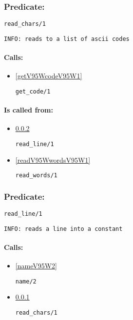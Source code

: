 \subsubsection{Predicate:} \label{readV95WcharsV95W1}

\begin{verbatim}
read_chars/1
\end{verbatim}

{\small \begin{verbatim}
INFO: reads to a list of ascii codes

\end{verbatim}}
\paragraph{Calls:} 
\begin{itemize}
\item \ref{getV95WcodeV95W1} 
\begin{verbatim}
get_code/1
\end{verbatim}

\end{itemize}
\paragraph{Is called from:} 
\begin{itemize}
\item \ref{readV95WlineV95W1} 
\begin{verbatim}
read_line/1
\end{verbatim}

\item \ref{readV95WwordsV95W1} 
\begin{verbatim}
read_words/1
\end{verbatim}

\end{itemize}

\subsubsection{Predicate:} \label{readV95WlineV95W1}

\begin{verbatim}
read_line/1
\end{verbatim}

{\small \begin{verbatim}
INFO: reads a line into a constant

\end{verbatim}}
\paragraph{Calls:} 
\begin{itemize}
\item \ref{nameV95W2} 
\begin{verbatim}
name/2
\end{verbatim}

\item \ref{readV95WcharsV95W1} 
\begin{verbatim}
read_chars/1
\end{verbatim}

\end{itemize}


